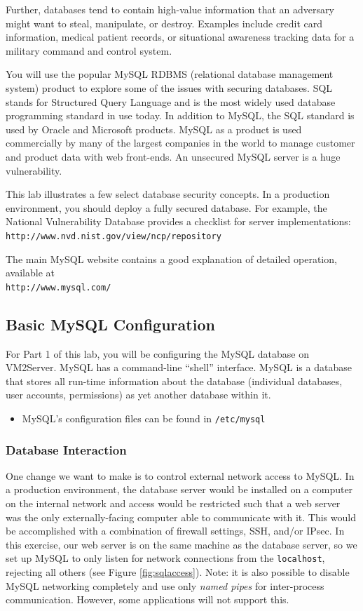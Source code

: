 \documentclass{article}
\begin{document}
Further, databases tend to contain high-value information that an adversary might want to steal, manipulate, or destroy. Examples include credit card information, medical patient records, or situational awareness tracking data for a military command and control system.

You will use the popular MySQL RDBMS (relational database management system) product to explore some of the issues with securing databases.  SQL stands for Structured Query Language and is the most widely used database programming standard in use today.  In addition to MySQL, the SQL standard is used by Oracle and Microsoft products.  MySQL as a product is used commercially by many of the largest companies in the world to manage customer and product data with web front-ends.  An unsecured MySQL server is a huge vulnerability.  

This lab illustrates a few select database security concepts.  In a production environment, you should deploy a fully secured database.  For example, the National Vulnerability Database provides a checklist for server implementations:
 {\tt http://www.nvd.nist.gov/view/ncp/repository }

The main MySQL website contains a good explanation of detailed operation, available at \\{\tt http://www.mysql.com/}

\subsection{Basic MySQL Configuration}
For Part 1 of this lab, you will be configuring the MySQL database on VM2Server.  MySQL has a command-line ``shell'' interface.  MySQL is a database that stores all run-time information about the database (individual databases, user accounts, permissions) as yet another database within it.

\begin{itemize}
\item MySQL's configuration files can be found in {\tt /etc/mysql}
\end{itemize}

\subsubsection{Database Interaction}

\noindent
One change we want to make is to control external network access to MySQL.   In a production environment, the database server would be installed on a computer on the internal network and access would be restricted such that a web server was the only externally-facing computer able to communicate with it.  This would be accomplished with a combination of firewall settings, SSH, and/or IPsec. In this exercise, our web server is on the same machine as the database server, so we set up MySQL to only listen for network connections from the {\tt localhost}, rejecting all others  (see Figure \ref{fig:sqlaccess}). Note: it is also possible to disable MySQL networking completely and use only \emph{named pipes} for inter-process communication. However, some applications will not support this.
\end{document}
